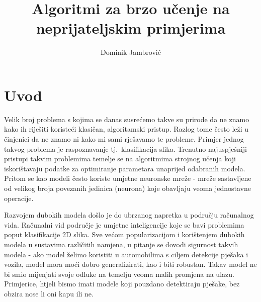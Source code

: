 \documentclass[times, utf8, zavrsni, numeric]{fer}
\begin{document}
\makeatletter
\renewcommand{\ALG@name}{Algoritam}
\makeatother


\title{Algoritmi za brzo učenje na neprijateljskim primjerima}

\author{Dominik Jambrović}

\maketitle

% 


\tableofcontents

\chapter{Uvod}
Velik broj problema s kojima se danas susrećemo takve su prirode da ne znamo kako ih riješiti koristeći klasičan, algoritamski pristup. Razlog tome često leži u činjenici da ne znamo ni kako mi sami rješavamo te probleme.
Primjer jednog takvog problema je raspoznavanje tj.\ klasifikacija slika.
Trenutno najuspješniji pristupi takvim problemima temelje se na algoritmima strojnog učenja koji iskorištavaju podatke za optimiranje parametara unaprijed odabranih modela.
Pritom se kao modeli često koriste umjetne neuronske mreže - mreže sastavljene od velikog broja povezanih jedinica (neurona) koje obavljaju veoma jednostavne operacije.

Razvojem dubokih modela došlo je do ubrzanog napretka u području računalnog vida. Računalni vid područje je umjetne inteligencije koje se bavi problemima poput klasifikacije 2D slika. 
Sve većom popularizacijom i korištenjem dubokih modela u sustavima različitih namjena, u pitanje se dovodi sigurnost takvih modela -
ako model želimo koristiti u automobilima s ciljem detekcije pješaka i vozila, model mora moći dobro generalizirati, kao i biti robustan. Takav model ne bi smio mijenjati svoje odluke na temelju veoma malih promjena na ulazu.
Primjerice, htjeli bismo imati modele koji pouzdano detektiraju pješake, bez obzira nose li oni kapu ili ne.
\end{document}
